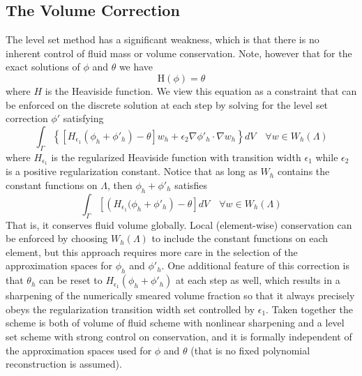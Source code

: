 \documentclass[letterpaper]{erdc}
\begin{document}
\subsection{The Volume Correction}\label{sec:VolumeCorrection}

The level set method has a significant weakness, which is that there is no
inherent control of fluid mass or volume conservation. Note, however that for
the exact solutions of $\phi$ and $\theta$ we have
\begin{equation}
  \mbox{H}(\phi) = \theta
\end{equation}
where $H$ is the Heaviside function. We view this equation as a constraint that
can be enforced on the discrete solution at each step by solving for the level
set correction $\phi'$ satisfying
\begin{equation}
  \int_{\Gamma} \left\{ \left[ H_{\epsilon_1}\left(\phi_h+\phi'_h \right) - \theta \right] w_h + \epsilon_2 \nabla \phi'_h \cdot \nabla w_h \right\} dV \quad \forall w \in W_h(\Lambda)
\end{equation}
where $H_{\epsilon_1}$ is the regularized Heaviside function with transition
width $\epsilon_1$ while $\epsilon_2$ is a positive regularization constant.
Notice that as long as $W_h$ contains the constant functions on $\Lambda$, then
$\phi_h+\phi'_h$ satisfies
\begin{equation}
  \int_{\Gamma} \left[ \left(H_{\epsilon_1}(\phi_h+\phi'_h \right) - \theta \right] dV \quad \forall w \in W_h (\Lambda)
\end{equation}
That is, it conserves fluid volume globally. Local (element-wise) conservation
can be enforced by choosing $W_h(\Lambda)$ to include the constant functions on
each element, but this approach requires more care in the selection of the
approximation spaces for $\phi_h$ and $\phi'_h$. One additional feature of this
correction is that $\theta_h$ can be reset to
$H_{\epsilon_1}(\phi_h + \phi'_h)$ at each step as well, which results in a
sharpening of the numerically smeared volume fraction so that it always
precisely obeys the regularization transition width set controlled by
$\epsilon_1$. Taken together the scheme is both of volume of fluid scheme with
nonlinear sharpening and a level set scheme with strong control on
conservation, and it is formally independent of the approximation spaces used
for $\phi$ and $\theta$ (that is no fixed polynomial reconstruction is
assumed).

%
%
%
\end{document}
